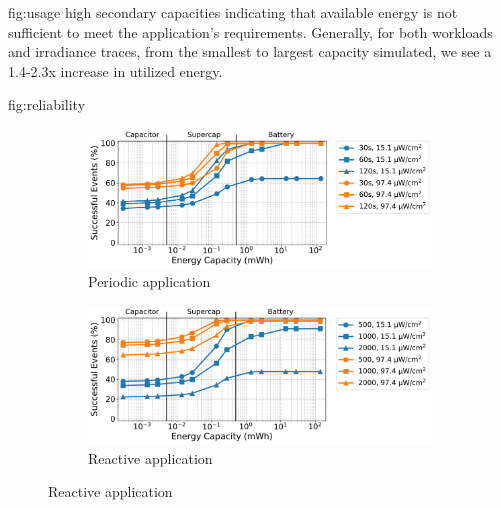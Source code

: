 \begin{definefigure*}{fig:usage}
{    high secondary capacities indicating that available energy is not
    sufficient to meet the application's requirements.
    Generally, for both workloads and irradiance traces, from
    the smallest to largest capacity simulated, we see a 1.4-2.3x increase in
    utilized energy.
    }
\end{definefigure*}

\begin{definefigure*}{fig:reliability}
  \centering
  \begin{subfigure}{\textwidth}
    \begin{subfigure}{0.5\textwidth}
      \centering
      \includegraphics[width=0.9\linewidth]{figs/capacity/sense_and_send/events_vs_secondary_size}
        \caption{Periodic application}
      \label{fig:reliability:sensesec}
    \end{subfigure}
    \begin{subfigure}{0.5\textwidth}
      \centering
      \includegraphics[width=0.9\linewidth]{figs/capacity/door_occupancy/events_vs_secondary_size}
      \caption{Reactive application}
      \label{fig:reliability:eventsec}
    \end{subfigure}
  \end{subfigure}

\end{definefigure*}
